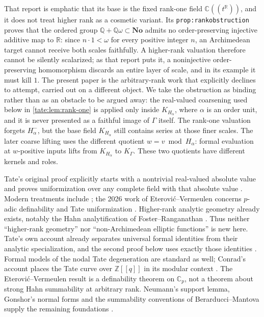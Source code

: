 \documentclass[11pt,letterpaper]{article}
\theoremstyle{definition}
\newcommand{\C}{\mathbb C}
\newcommand{\R}{\mathbb R}
\newcommand{\Q}{\mathbb Q}
\newcommand{\Z}{\mathbb Z}
\newcommand{\No}{\mathbf{No}}
\begin{document}
That report is emphatic that its base is the fixed rank-one field
$\C((t^\R))$, and it does not treat higher rank as a cosmetic variant.
Its \texttt{prop:rankobstruction} proves that the ordered group
$\Q+\Q\omega\subset\No$ admits no order-preserving injective additive map
to $\R$: since $n\cdot1<\omega$ for every positive integer $n$, an
Archimedean target cannot receive both scales faithfully. A higher-rank
valuation therefore cannot be silently scalarized; as that report puts
it, a noninjective order-preserving homomorphism discards an entire
layer of scale, and in its example it must kill $1$. The
present paper is the arbitrary-rank work that \cite{RepoRankOne}
explicitly declines to attempt, carried out on a different object. We
take the obstruction as binding rather than as an obstacle to be argued
away: the real-valued coarsening used below in \cref{tate:lem:rank-one}
is applied only inside $K_{H_\alpha}$, where $\alpha$ is an order unit,
and it is never presented as a faithful image of $\Gamma$ itself.
The rank-one valuation forgets $H_\alpha^-$, but the base field
$K_{H_\alpha}$ still contains series at those finer scales. The later
coarse lifting uses the different quotient $w=v\bmod H_\alpha$:
formal evaluation at $w$-positive inputs lifts from $K_{H_\alpha}$ to
$K_\Gamma$. These two quotients have different kernels and roles.

Tate's original proof explicitly starts with a nontrivial real-valued
absolute value and proves uniformization over any complete field with
that absolute value \cite{Tate}. Modern treatments include
\cite{Silverman,BGR}; the 2026 work of Eterovi\'c--Vermeulen concerns
$p$-adic definability and Tate uniformization \cite{EV}. Higher-rank
analytic geometry already exists, notably the Hahn analytification of
Foster--Ranganathan \cite{FR}. Thus neither ``higher-rank geometry'' nor
``non-Archimedean elliptic functions'' is new here. Tate's own account
already separates universal formal identities from their analytic
specialization, and the second proof below uses exactly those identities
\cite{Tate}. Formal models of the nodal Tate degeneration are standard as
well; Conrad's account places the Tate curve over $\Z[[q]]$ in its modular
context \cite{Conrad}. The Eterovi\'c--Vermeulen result is a definability
theorem on $\C_p$, not a theorem about strong Hahn summability at arbitrary
rank. Neumann's support lemma, Gonshor's normal forms and the summability
conventions of Berarducci--Mantova supply the remaining foundations
\cite{Neumann,Gonshor,BM}.
\end{document}

